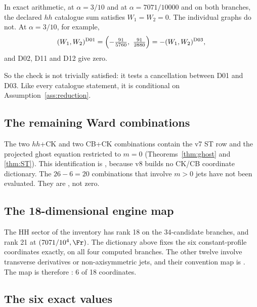 \begin{proposition}
\label{prop:v8hhward}
In exact arithmetic, at \(\alpha=3/10\) and at
\(\alpha=7071/10000\) and on both branches, the declared \(hh\) catalogue sum
satisfies \(W_1=W_2=0\).
The individual graphs do not. At \(\alpha=3/10\), for example,
\[
 (W_1,W_2)^{\rm D01}=\Bigl(-\tfrac{91}{5760},\ \tfrac{91}{2880}\Bigr)
 =-(W_1,W_2)^{\rm D03},
\]
and D02, D11 and D12 give zero.
\end{proposition}

\noindent
So the check is not trivially satisfied: it tests a cancellation
between D01 and D03. Like every catalogue statement, it is
conditional on Assumption~\ref{ass:reduction}.

\subsection{The remaining Ward combinations}

The two \(hh\)+CK and two CB+CK combinations contain the v7
ST row and the projected ghost equation restricted to \(m=0\)
(Theorems~\ref{thm:ghost} and \ref{thm:ST}). This identification
is \CONDITIONAL, because v8 builds no CK/CB coordinate dictionary.
The \(26-6=20\) combinations that involve \(m>0\) jets have not
been evaluated. They are \OPEN, not zero.

\subsection{The 18-dimensional engine map}

The HH sector of the inventory has rank 18 on the 34-candidate
branches, and rank 21 at \((7071/10^4,\Fr)\). The dictionary above
fixes the six constant-profile coordinates exactly, on all four
computed branches. The other twelve involve transverse
derivatives or non-axisymmetric jets, and their convention map is
\OPEN. The map is therefore \PARTIAL: 6 of 18 coordinates.

\subsection{The six exact values}

